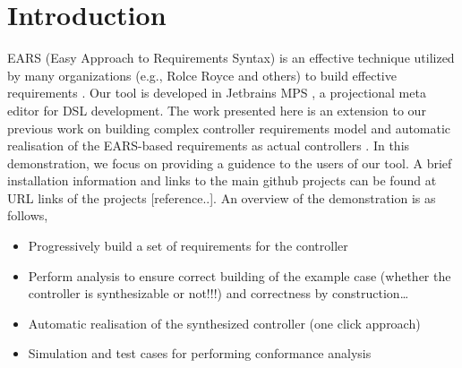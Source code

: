\section{Introduction}
\label{sec:intro}
EARS (Easy Approach to Requirements Syntax) is an effective technique utilized
by many organizations (e.g., Rolce Royce and others) to build effective
requirements \cite{EARS}. Our tool is developed in Jetbrains MPS \cite{DBLP:conf/pppj/PechSV13}, a projectional meta editor for DSL development. 
The work presented here is an extension to our previous work on building complex
controller requirements model and automatic realisation of the EARS-based
requirements as actual controllers \cite{LucioRCA16}. In this demonstration, we
focus on providing a guidence to the users of our tool. A brief
installation information and links to the main github projects can be found at URL links of the projects [reference..].
An overview of the demonstration is as follows,
\begin{itemize}
  \item Progressively build a set of requirements for the controller
  \item Perform analysis to ensure correct building of the example case
  (whether the controller is synthesizable or not!!!) and correctness by
  construction\ldots
  \item Automatic realisation of the synthesized controller (one click approach)
  \item Simulation and test cases for performing conformance analysis
\end{itemize}